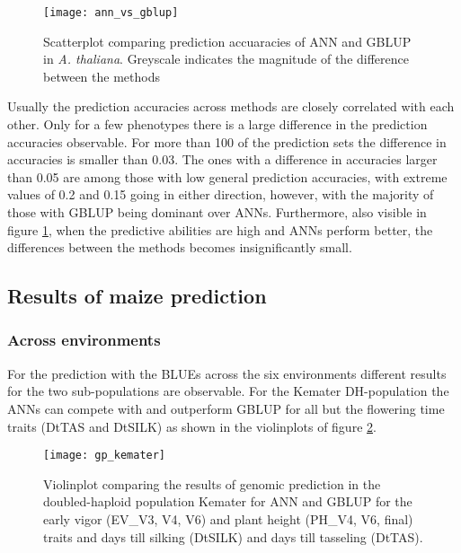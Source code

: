 \begin{figure}[H]
  \centering
  \texttt{[image: ann\_vs\_gblup]}
  \decoRule
  \caption[Scatterplot comparing prediction accuaracies of ANN and GBLUP in
  \textit{A. thaliana}]{Scatterplot comparing prediction accuaracies of ANN and GBLUP in
    \textit{A. thaliana}. Greyscale indicates the magnitude of the difference between the
    methods}
\label{fig:annblup}
\end{figure}

Usually the prediction accuracies across methods are closely correlated with each other.
Only for a few phenotypes there is a large difference in the prediction accuracies
observable. For more than 100 of the prediction sets the difference in accuracies is
smaller than 0.03. The ones with a difference in accuracies larger than 0.05 are among
those with low general prediction accuracies, with extreme values of 0.2 and 0.15 going in
either direction, however, with the majority of those with GBLUP being dominant over
ANNs. Furthermore, also visible in figure \ref{fig:annblup}, when the predictive abilities
are high and ANNs perform better, the differences between the methods becomes
insignificantly small.

\subsection{Results of maize prediction}
\subsubsection{Across environments}

For the prediction with the BLUEs across the six environments different results for the
two sub-populations are observable.  For the Kemater DH-population the ANNs can compete
with and outperform GBLUP for all but the flowering time traits (DtTAS and DtSILK) as
shown in the violinplots of figure \ref{fig:ke_ann}.

\begin{figure}[H]
 \centering \texttt{[image: gp\_kemater]}
 \decoRule
 \caption[Violinplot comparing the results for GP in the DH population Kemater for ANN and
 GBLUP]{Violinplot comparing the results of genomic prediction in the doubled-haploid
   population Kemater for ANN and GBLUP for the early vigor (EV\_V3, V4, V6) and plant height
   (PH\_V4, V6, final) traits and days till silking (DtSILK) and days till tasseling (DtTAS). }
\label{fig:ke_ann}
\end{figure}

